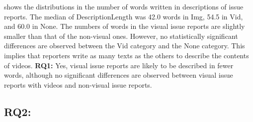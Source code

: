  shows the distributions in the number of words 
written in descriptions of issue reports. 
The median of DescriptionLength was 42.0 words in Img, 
54.5 in Vid, and 60.0 in None. 
The numbers of words in the visual issue reports are slightly smaller than 
that of the non-visual ones.
However, no statistically significant differences are observed 
between the Vid category and the None category. 
This implies that reporters write as many texts as the others 
to describe the contents of videos. 
\summarybox
{
{\bf RQ1: }{Yes, 
visual issue reports are likely to be described in fewer words, although no significant differences are observed between visual issue reports with videos and non-visual issue reports. 
}}

\subsection*{RQ2: \RQtwo{}}


